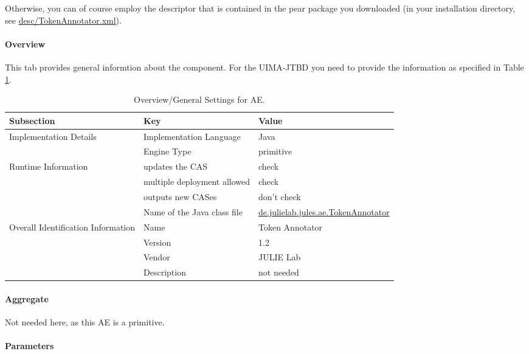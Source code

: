 \documentclass[11pt,a4paper,halfparskip]{scrartcl}
\begin{document}
Otherwise, you can of course employ the descriptor that is contained
in the pear package you downloaded (in your installation directory, see
\url{desc/TokenAnnotator.xml}).

\paragraph{Overview}
This tab provides general informtion about the component. For the
UIMA-JTBD you need to provide the information as specified in Table
\ref{tab:overview}.

\begin{table}[h!]
  \centering
  \begin{tabular}{|p{3.5cm}|p{4cm}|p{6cm}|}
    \hline
    Subsection & Key & Value \\
    \hline\hline
    Implementation Details & Implementation Language & Java \\
    \cline{2-3}
    & Engine Type & primitive \\
    \hline
    Runtime Information & updates the CAS & check \\
    \cline{2-3}
    & multiple deployment allowed & check \\
    \cline{2-3}
    & outputs new CASes &  don't check \\
    \cline{2-3}
    & Name of the Java class file & \url{de.julielab.jules.ae.TokenAnnotator}\\
    \hline
    Overall Identification Information & Name &  Token Annotator \\
    \cline{2-3}
    & Version &  1.2 \\
    \cline{2-3}
    & Vendor & JULIE Lab\\
    \cline{2-3}
    & Description & not needed\\
    \hline
  \end{tabular}
  \caption{Overview/General Settings for AE.}
  \label{tab:overview}
\end{table}


\paragraph{Aggregate}
Not needed here, as this AE is a primitive.

\paragraph{Parameters}
\label{sss:parameters}
\end{document}
